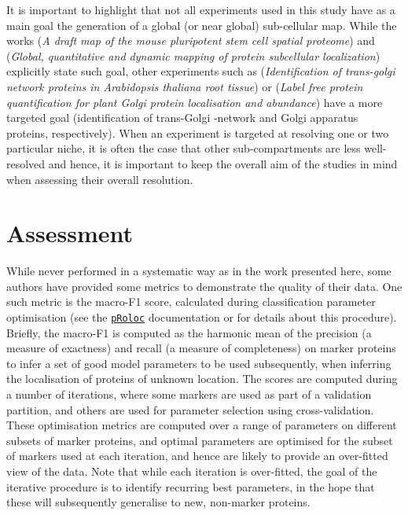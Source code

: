 \documentclass[12pt]{article}\usepackage[]{graphicx}\usepackage[]{color}
\newcommand{\Rpackage}[1]{\texttt{#1}}
\newcommand\Biocpkg[1]{%
  {\href{http://bioconductor.org/packages/#1}%
    {\Rpackage{#1}}}}
\begin{document}
It is important to highlight that not all experiments used in this
study have as a main goal the generation of a global (or near global)
sub-cellular map. While the works \citet{Christoforou:2016} (\textit{A
  draft map of the mouse pluripotent stem cell spatial proteome}) and
\citet{Itzhak:2016} (\textit{Global, quantitative and dynamic mapping
  of protein subcellular localization}) explicitly state such goal,
other experiments such as \citet{Groen:2014} (\textit{Identification
  of trans-golgi network proteins in Arabidopsis thaliana root
  tissue}) or \citet{Nikolovski:2014} (\textit{Label free protein
  quantification for plant Golgi protein localisation and abundance})
have a more targeted goal (identification of trans-Golgi -network and
Golgi apparatus proteins, respectively). When an experiment is
targeted at resolving one or two particular niche, it is often the
case that other sub-compartments are less well-resolved and hence, it
is important to keep the overall aim of the studies in mind when
assessing their overall resolution.

\section{Assessment}

While never performed in a systematic way as in the work presented
here, some authors have provided some metrics to demonstrate the
quality of their data. One such metric is the macro-F1 score,
calculated during classification parameter optimisation (see the
\Biocpkg{pRoloc} \cite{Gatto:2014a} documentation or \cite{Gatto:2014}
for details about this procedure). Briefly, the macro-F1 is computed
as the harmonic mean of the precision (a measure of exactness) and
recall (a measure of completeness) on marker proteins to infer a set
of good model parameters to be used subsequently, when inferring the
localisation of proteins of unknown location. The scores are computed
during a number of iterations, where some markers are used as part of
a validation partition, and others are used for parameter selection
using cross-validation. These optimisation metrics are computed over a
range of parameters on different subsets of marker proteins, and
optimal parameters are optimised for the subset of markers used at
each iteration, and hence are likely to provide an over-fitted view of
the data. Note that while each iteration is over-fitted, the goal of
the iterative procedure is to identify recurring best parameters, in
the hope that these will subsequently generalise to new, non-marker
proteins.
\end{document}
